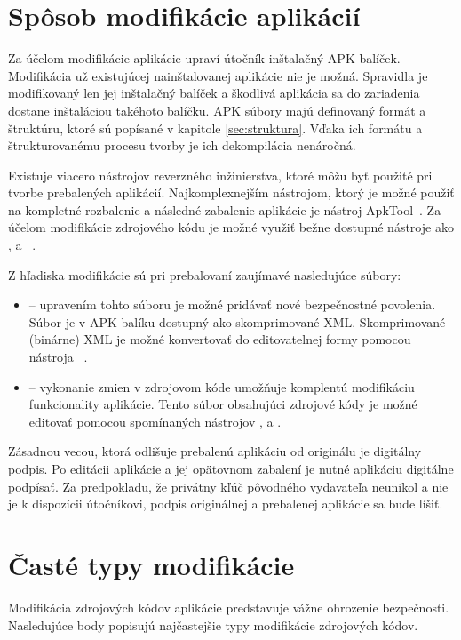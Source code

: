 \section{Spôsob modifikácie aplikácií}
Za účelom modifikácie aplikácie upraví útočník inštalačný APK balíček. Modifikácia už existujúcej nainštalovanej aplikácie nie je možná. Spravidla je modifikovaný len jej inštalačný balíček a škodlivá aplikácia sa do zariadenia dostane inštaláciou takéhoto balíčku.
APK súbory majú definovaný formát a štruktúru, ktoré sú popísané v kapitole \ref{sec:struktura}. Vďaka ich formátu a štrukturovanému procesu tvorby je ich dekompilácia nenáročná.

Existuje viacero nástrojov reverzného inžinierstva, ktoré môžu byť použité pri tvorbe prebalených aplikácií. Najkomplexnejším nástrojom, ktorý je možné použiť na kompletné rozbalenie a následné zabalenie aplikácie je nástroj ApkTool~\cite{Apktool}. Za účelom modifikácie zdrojového kódu je možné využiť bežne dostupné nástroje ako ,  a  ~\cite{Dex2jar, jdgui, smali}.

Z hľadiska modifikácie sú pri prebaľovaní zaujímavé nasledujúce súbory:

\begin{itemize}
	\item {} -- upravením tohto súboru je možné pridávať nové bezpečnostné povolenia. Súbor je v APK balíku dostupný ako skomprimované XML. Skomprimované (binárne) XML je možné konvertovať do editovatelnej formy pomocou nástroja ~\cite{Apktool}.
	\item {} -- vykonanie zmien v zdrojovom kóde umožňuje komplentú modifikáciu funkcionality aplikácie. Tento súbor obsahujúci zdrojové kódy je možné editovať pomocou spomínaných nástrojov ,  a .
\end{itemize}

Zásadnou vecou, ktorá odlišuje prebalenú aplikáciu od originálu je digitálny podpis. Po editácii aplikácie a jej opätovnom zabalení je nutné aplikáciu digitálne podpísať. Za predpokladu, že privátny kľúč pôvodného vydavateľa neunikol a nie je k dispozícii útočníkovi, podpis originálnej a prebalenej aplikácie sa bude líšiť. 

\section{Časté typy modifikácie}

Modifikácia zdrojových kódov aplikácie predstavuje vážne ohrozenie bezpečnosti. Nasledujúce body popisujú najčastejšie typy modifikácie zdrojových kódov.

